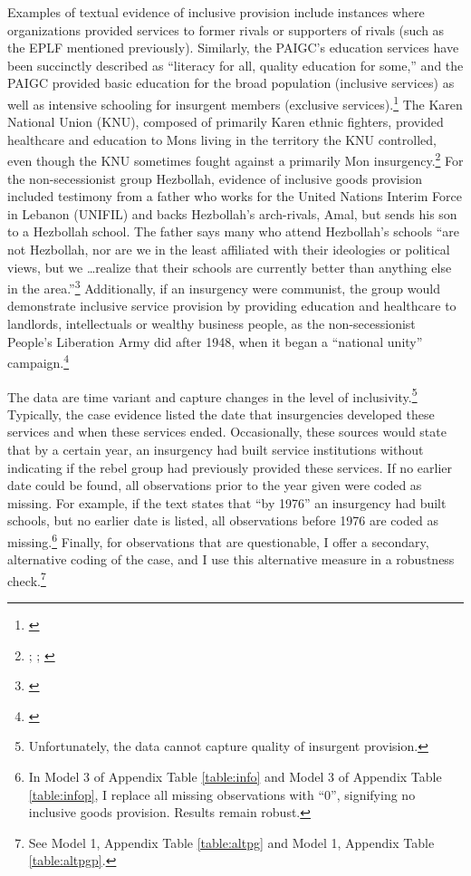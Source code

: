 \documentclass[12pt, letterpaper]{article}
\begin{document}
Examples of textual evidence of inclusive provision include instances where organizations provided services to former rivals or supporters of rivals (such as the EPLF mentioned previously). Similarly, the PAIGC's education services have been succinctly described as ``literacy for all, quality education for some,'' and the PAIGC provided basic education for the broad population (inclusive services) as well as intensive schooling for insurgent members (exclusive services).\footnote{\citealt[97]{dhada1993warriors}} The Karen National Union (KNU), composed of primarily Karen ethnic fighters, provided healthcare and education to Mons living in the territory the KNU controlled, even though the KNU sometimes fought against a primarily Mon insurgency.\footnote{\citealt[255-67]{fong2008revolution}; \citealt[384-402]{smith1991insurgency}; \citealt{oh2013competing}} For the non-secessionist group Hezbollah, evidence of inclusive goods provision included testimony from a father who works for the United Nations Interim Force in Lebanon (UNIFIL) and backs Hezbollah's arch-rivals, Amal, but sends his son to a Hezbollah school. The father says many who attend Hezbollah's schools ``are not Hezbollah, nor are we in the least affiliated with their ideologies or political views, but we \ldots realize that their schools are currently better than anything else in the area.''\footnote{\citealt[164]{jaber1997hezbollah}} Additionally, if an insurgency were communist, the group would demonstrate inclusive service provision by providing education and healthcare to landlords, intellectuals or wealthy business people, as the non-secessionist People's Liberation Army did after 1948, when it began a ``national unity'' campaign.\footnote{\citealt[203-4 and 221-224]{pepper1999civil}} 

The data are time variant and capture changes in the level of inclusivity.\footnote{Unfortunately, the data cannot capture quality of insurgent provision.} Typically, the case evidence listed the date that insurgencies developed these services and when these services ended. Occasionally, these sources would state that by a certain year, an insurgency had built service institutions without indicating if the rebel group had previously provided these services. If no earlier date could be found, all observations prior to the year given were coded as missing. For example, if the text states that ``by 1976'' an insurgency had built schools, but no earlier date is listed, all observations before 1976 are coded as missing.\footnote{In Model 3 of Appendix Table \ref{table:info} and Model 3 of Appendix Table \ref{table:infop}, I replace all missing observations with ``0'', signifying no inclusive goods provision. Results remain robust.} Finally, for observations that are questionable, I offer a secondary, alternative coding of the case, and I use this alternative measure in a robustness check.\footnote{See Model 1, Appendix Table \ref{table:altpg} and Model 1, Appendix Table \ref{table:altpgp}.}  %
\end{document}
